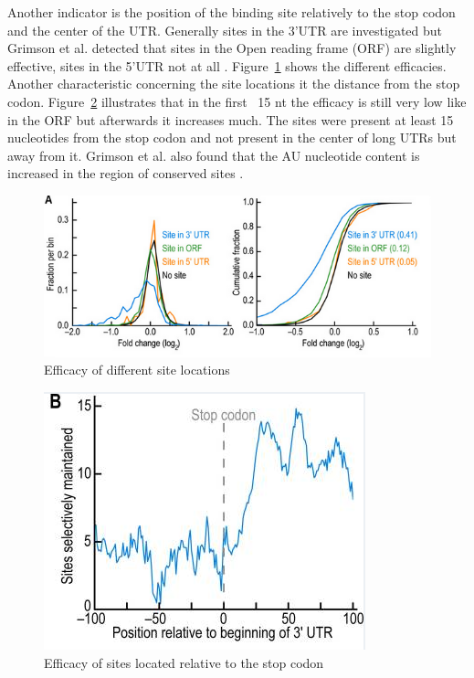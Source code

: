 \documentclass[12pt]{article}
\begin{document}
Another indicator is the position of the binding site relatively to the stop codon and the center of the UTR. Generally sites in the 3'UTR are investigated but Grimson et al. detected that sites in the Open reading frame (ORF) are slightly effective, sites in the 5'UTR not at all \cite{Grimson}. Figure~\ref{siteorf} shows the different efficacies. Another characteristic concerning the site locations it the distance from the stop codon. Figure~\ref{sitestop} illustrates that in the first ~15 nt the efficacy is still very low like in the ORF but afterwards it increases much. 
The sites were present at least 15 nucleotides from the stop codon and not present in the center of long UTRs but away from it. Grimson et al. also found that the AU nucleotide content is increased in the region of conserved sites \cite{Grimson}.


\begin{figure}
\centering
\includegraphics[scale=0.8]{results/sites_orf.PNG}
\caption{Efficacy of different site locations}
\label{siteorf}
\end{figure}

\begin{figure}
\centering
\includegraphics[scale=0.7]{results/site_stop.PNG} 
\caption{Efficacy of sites located relative to the stop codon}
\label{sitestop}
\end{figure}
\end{document}
